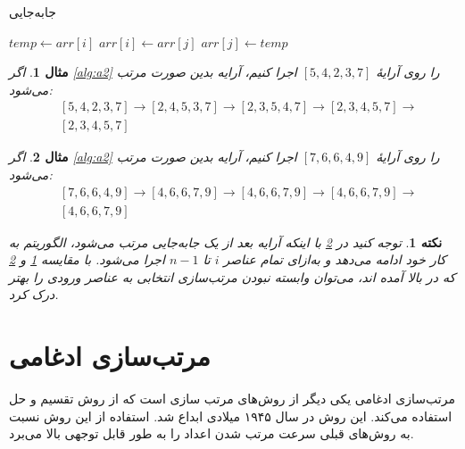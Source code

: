\documentclass[12pt]{article}
\newtheorem{remark}{نکته}
\newtheorem{example}{مثال}
\begin{document}
\begin{algorithm}[H]
  \caption{جابه‌جایی}
  \label{alg:a3}
  \begin{latin}
    \begin{algorithmic}[1]
      \State $temp \gets arr[i]$
      \State $arr[i] \gets arr[j]$
      \State $arr[j] \gets temp$
      \EndProcedure
    \end{algorithmic}
  \end{latin}
\end{algorithm}

\begin{example}
  \label{ex:e2}
  اگر
  \cref{alg:a2}
  را روی آرایهٔ
  $[5, 4, 2, 3, 7]$
  اجرا کنیم،
  آرایه بدین صورت مرتب می‌شود:
  \begin{align*}
     & [5, 4, 2, 3, 7] \rightarrow [2, 4, 5, 3, 7] \rightarrow
    [2, 3, 5, 4, 7] \rightarrow [2, 3, 4, 5, 7] \rightarrow    \\
     & [2, 3, 4, 5, 7]
  \end{align*}
\end{example}

\begin{example}
  \label{ex:e3}
  اگر
  \cref{alg:a2}
  را روی آرایهٔ
  $[7, 6, 6, 4, 9]$
  اجرا کنیم،
  آرایه بدین صورت مرتب می‌شود:
  \begin{align*}
     & [7, 6, 6, 4, 9] \rightarrow [4, 6, 6, 7, 9] \rightarrow
    [4, 6, 6, 7, 9] \rightarrow [4, 6, 6, 7, 9] \rightarrow    \\
     & [4, 6, 6, 7, 9]
  \end{align*}
\end{example}

\begin{remark}
  توجه کنید در
  \cref{ex:e3}
  با اینکه آرایه بعد از یک جابه‌جایی مرتب می‌شود،
  الگوریتم به کار خود ادامه می‌دهد و به‌ازای تمام عناصر
  $i$
  تا
  $n-1$
  اجرا می‌شود.
  با مقایسه
  \cref{ex:e2}
  و
  \cref{ex:e3}
  که در بالا آمده اند،
  می‌توان وابسته نبودن مرتب‌سازی انتخابی به عناصر ورودی را بهتر درک کرد.
\end{remark}


\section{مرتب‌سازی ادغامی\protect{}}
مرتب‌سازی ادغامی یکی دیگر از روش‌های مرتب سازی است که از روش تقسیم و حل
استفاده می‌کند.
این روش در سال ۱۹۴۵ میلادی ابداع شد.
\cite{art}
استفاده از این روش نسبت به روش‌های قبلی سرعت مرتب شدن اعداد را به طور قابل توجهی بالا می‌برد.
\end{document}
